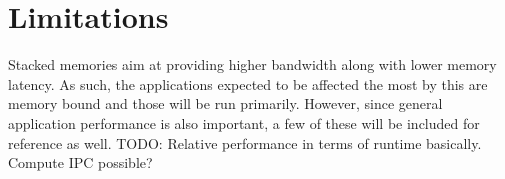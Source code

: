 \section{Limitations}
Stacked memories aim at providing higher bandwidth along with lower memory latency. As such, the applications expected to be affected the most by this are memory bound and those will be run primarily. However, since general application performance is also important, a few of these will be included for reference as well. TODO: Relative performance in terms of runtime basically. Compute IPC possible? 
